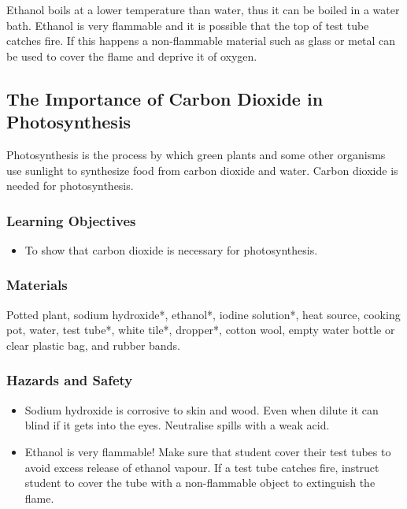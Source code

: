 Ethanol boils at a lower temperature than water, thus it can be boiled in a water bath. Ethanol is very flammable and it is possible that the top of test tube catches fire. If this happens a non-flammable material such as glass or metal can be used to cover the flame and deprive it of oxygen.

\subsection{The Importance of Carbon Dioxide in Photosynthesis}
Photosynthesis is the process by which green plants and some other organisms use sunlight to synthesize food from carbon dioxide and water. Carbon dioxide is needed for photosynthesis.

\subsubsection*{Learning Objectives}
\begin{itemize}
\item{To show that carbon dioxide is necessary for photosynthesis.}
\end{itemize}

\subsubsection*{Materials}
Potted plant, sodium hydroxide*, ethanol*, iodine solution*, heat source, cooking pot, water, test tube*, white tile*, dropper*, cotton wool, empty water bottle or clear plastic bag, and rubber bands.

\subsubsection*{Hazards and Safety}
\begin{itemize}
\item{Sodium hydroxide is corrosive to skin and wood. Even when dilute it can blind if it gets into the eyes. Neutralise spills with a weak acid.}
\item{Ethanol is very flammable! Make sure that student cover their test tubes to avoid excess release of ethanol vapour. If a test tube catches fire, instruct student to cover the tube with a non-flammable object to extinguish the flame.}
\end{itemize}

